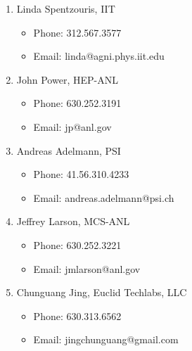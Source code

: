 \documentclass[11pt,a4paper,sans]{moderncv}        %
\begin{document}
\begin{enumerate}
	\itemsep1em 
	\item Linda Spentzouris, IIT
	\begin{itemize}
		\item[] Phone: 312.567.3577
		\item[] Email: linda@agni.phys.iit.edu
	\end{itemize}
	\item John Power, HEP-ANL
	\begin{itemize}
		\item[] Phone: 630.252.3191
		\item[] Email: jp@anl.gov
	\end{itemize}
	\item Andreas Adelmann, PSI
	\begin{itemize}
		\item[] Phone: 41.56.310.4233
		\item[] Email: andreas.adelmann@psi.ch
	\end{itemize}
	\item Jeffrey Larson, MCS-ANL
	\begin{itemize}
		\item[] Phone: 630.252.3221
		\item[] Email: jmlarson@anl.gov
	\end{itemize}
	\item Chunguang Jing, Euclid Techlabs, LLC
	\begin{itemize}
		\item[] Phone: 630.313.6562
		\item[] Email: jingchunguang@gmail.com
	\end{itemize}
	
\end{enumerate}

\fi


\clearpage
\end{document}
